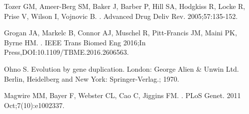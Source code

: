 \documentclass[10pt,letterpaper]{article}
\begin{document}
\begin{thebibliography}{10}
Tozer GM, Ameer-Berg SM, Baker J, Barber P, Hill SA, Hodgkiss R, Locke R, Prise V, Wilson I, Vojnovic B.
.
\newblock Advanced Drug Deliv Rev. 2005;57:135-152.

Grogan JA, Markelc B, Connor AJ, Muschel R, Pitt-Francis JM, Maini PK, Byrne HM.
.
\newblock IEEE Trans Biomed Eng 2016;In Press,DOI:10.1109/TBME.2016.2606563.

Ohno S.
\newblock Evolution by gene duplication.
\newblock London: George Alien \& Unwin Ltd. Berlin, Heidelberg and New York:
  Springer-Verlag.; 1970.

Magwire MM, Bayer F, Webster CL, Cao C, Jiggins FM.
.
\newblock PLoS Genet. 2011 Oct;7(10):e1002337.

\end{thebibliography}
\end{document}
